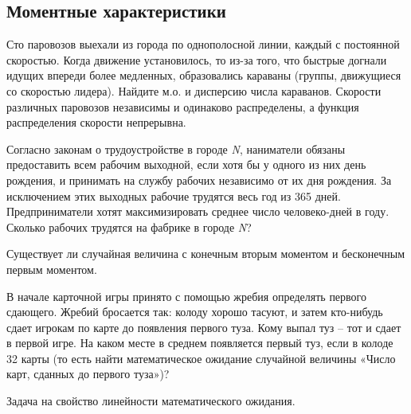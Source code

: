 \subsection{Моментные характеристики}

\begin{problem}
Сто паровозов выехали из города по однополосной линии, каждый с постоянной скоростью. Когда движение установилось, то из-за того, что быстрые догнали идущих впереди более медленных, образовались караваны (группы, движущиеся со скоростью лидера). Найдите м.о. и дисперсию числа караванов. Скорости различных паровозов независимы и одинаково распределены, а функция распределения скорости непрерывна.
\end{problem}

\begin{problem}
Согласно законам о трудоустройстве в городе \textit{N}, наниматели обязаны предоставить всем рабочим выходной, если хотя бы у одного из них день рождения, и принимать на службу рабочих независимо от их дня рождения. За исключением этих выходных рабочие трудятся весь год из 365 дней. Предприниматели хотят максимизировать среднее число человеко-дней в году. Сколько рабочих трудятся на фабрике в городе \textit{N}?

\end{problem}

\begin{problem}
Существует ли случайная величина с конечным вторым моментом и бесконечным первым моментом.
\end{problem}

\begin{problem}
В начале карточной игры принято с помощью жребия определять первого сдающего. Жребий бросается так: колоду хорошо тасуют, и затем кто-нибудь сдает игрокам по карте до появления первого туза. Кому выпал туз -- тот и сдает в первой игре. На каком месте в среднем появляется первый туз, если в колоде 32 карты (то есть найти математическое ожидание случайной величины «Число карт, сданных до первого туза»)?

\begin{ordre} 
Задача на свойство линейности математического ожидания.
\end{ordre}

\end{problem}

